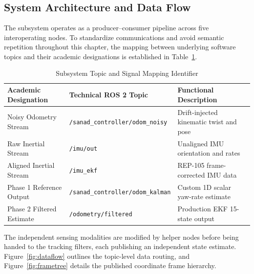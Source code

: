 
\subsection{System Architecture and Data Flow}
\label{subsec:architecture}

The subsystem operates as a producer--consumer pipeline across five interoperating nodes. To standardize communications and avoid semantic repetition throughout this chapter, the mapping between underlying software topics and their academic designations is established in Table~\ref{tab:topic_mapping}.

\begin{table}[H]
\centering
\caption{Subsystem Topic and Signal Mapping Identifier}
\label{tab:topic_mapping}
\begin{tabular}{@{}lll@{}}
\toprule
Academic Designation & Technical ROS 2 Topic & Functional Description \\
\midrule
Noisy Odometry Stream & \texttt{/sanad\_controller/odom\_noisy} & Drift-injected kinematic twist and pose \\
Raw Inertial Stream & \texttt{/imu/out} & Unaligned IMU orientation and rates \\
Aligned Inertial Stream & \texttt{/imu\_ekf} & REP-105 frame-corrected IMU data \\
Phase 1 Reference Output & \texttt{/sanad\_controller/odom\_kalman} & Custom 1D scalar yaw-rate estimate \\
Phase 2 Filtered Estimate & \texttt{/odometry/filtered} & Production EKF 15-state output \\
\bottomrule
\end{tabular}
\end{table}

The independent sensing modalities are modified by helper nodes before being handed to the tracking filters, each publishing an independent state estimate. Figure~\ref{fig:dataflow} outlines the topic-level data routing, and Figure~\ref{fig:frametree} details the published coordinate frame hierarchy.

